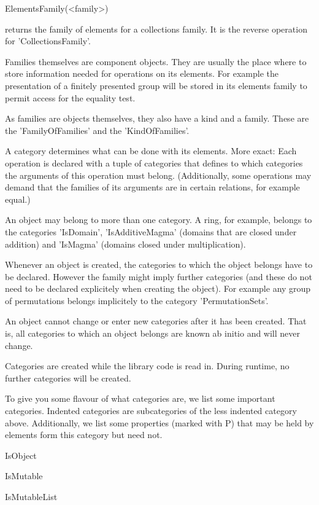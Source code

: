 \>ElementsFamily(<family>)

returns the family of elements for a collections family. It is the reverse
operation for 'CollectionsFamily'.

\danger
\label{storeinfamily}
Families themselves are component objects. They are usually the place where
to store
information needed for operations on its elements. For example the
presentation of a finitely presented group will be stored in its elements
family to permit access for the equality test.

\danger
As families are objects themselves, they also have a kind and a family.
These are the 'FamilyOfFamilies' and the 'KindOfFamilies'.


A category determines what can be done with its elements. More exact: Each
operation is declared with a tuple of categories that defines to which
categories the arguments of this operation must belong. (Additionally, some
operations may demand that the families of its arguments are in certain
relations, for example equal.)

An object may belong to more than one category. A ring, for example, belongs
to the categories 'IsDomain', 'IsAdditiveMagma' (domains that are closed under
addition) and 'IsMagma' (domains closed under multiplication).

\danger
Whenever an object is created, the categories to which the object belongs
have to be declared. However the family might imply further categories (and
these do not need to be declared explicitely when creating the object).
For example any
group of permutations belongs implicitely to the category 'PermutationSets'.

An object cannot change or enter new categories after it has been created.
That is, all categories to which an object belongs are known ab initio and
will never change.

\danger
Categories are created while the library code is read in. During runtime, no
further categories will be created.

To give you some flavour of what categories are, we list some important
categories. Indented categories are subcategories of the less indented
category above.
Additionally, we list some properties (marked with P) that may be held
by elements form this category but need not.


\begintt
IsObject

  IsMutable

    IsMutableList

